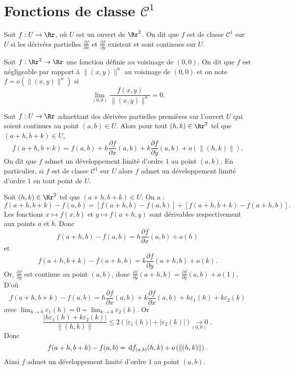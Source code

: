 \documentclass[class=report,crop=false]{standalone}
\begin{document}
\vskip8mm

\section{Fonctions de classe \texorpdfstring{$\mathscr{C}^1$}%
{C1}}

\vskip4mm

\begin{definition}Soit $f:U\to \Rr$, o\`u $U$ est un ouvert de $\Rr^2$. On dit que $f$ est de classe ${\mathscr C}^1$ sur $U$ si les dérivées partielles $\displaystyle \frac{\partial f}{\partial x}$ et $\displaystyle \frac{\partial f}{\partial y}$ existent et sont continues sur $U$.
\end{definition}

\vskip4mm

Soit $f:\Rr^2\to \Rr$ une fonction définie au voisinage de $(0,0)$. On dit que $f$ est négligeable par rapport à $\|(x,y)\|^n$ au voisinage de $(0,0)$ et on note $f=o\left(\|(x,y)\|^n\right)$ si 
$$\lim_{(0,0)}\frac{f(x,y)}{\|(x,y)\|^n}=0.$$

\vskip4mm

\begin{theoreme}Soit $f:U\to \Rr$ admettant des dérivées partielles premières sur l'ouvert $U$ qui soient continues au point $(a,b)\in U$. Alors pour tout $(h,k)\in \Rr^2$ tel que $(a+h,b+k)\in U$,
$$f(a+h,b+k)=f(a,b)+h\frac{\partial f}{\partial x}(a,b)+k\frac{\partial f}{\partial y}(a,b)+o\left(\|(h,k)\|\right).$$
On dit que $f$ admet un développement limité d'ordre $1$ au point $(a,b)$. En particulier, si $f$ est de classe ${\mathscr C}^1$ sur $U$ alors $f$ admet un développement limité d'ordre $1$ en tout point de $U$.
\end{theoreme}

\vskip4mm

Soit $(h,k)\in \Rr^2$ tel que $(a+h,b+k)\in U$. On a :
$$f(a+h,b+k)-f(a,b)=\left[f(a+h,b)-f(a,b)\right]+\left[f(a+h,b+k)-f(a+h,b)\right].$$
Les fonctions $x\mapsto f(x,b)$ et $y\mapsto f(a+h,y)$ sont dérivables respectivement aux points $a$ et $b$. Donc
$$f(a+h,b)-f(a,b)=h\frac{\partial f}{\partial x}(a,b)+o(h)$$
et
$$f(a+h,b+k)-f(a+h,b)=k\frac{\partial f}{\partial y}(a+h,b)+o(k).$$
Or, $\displaystyle \frac{\partial f}{\partial y}$ est continue au point $(a,b)$, donc $\displaystyle \frac{\partial f}{\partial y}(a+h,b)=\frac{\partial f}{\partial y}(a,b)+o(1)$. D'o\`u
$$f(a+h,b+k)-f(a,b)=h\frac{\partial f}{\partial x}(a,b)+k\frac{\partial f}{\partial x}(a,b)+h\varepsilon _1(h)+k\varepsilon _2(k)$$
avec $\displaystyle \lim _{h\to 0}\varepsilon _1(h)=0=\lim _{k\to 0}\varepsilon _2(k)$. Or
$$\frac{|h\varepsilon _1(h)+k\varepsilon _2(k)|}{\|(h,k)\|}\leq 2\left(|\varepsilon _1(h)|+|\varepsilon _2(k)|\right)\underset{(0,0)\; \; \; }{\longrightarrow 0}.$$
Donc
$$f(a+h,b+k)-f(a,b)=\,\mathrm{d} f_{(a,b)}(h,k)+o\left(\|(h,k)\|\right).$$
Ainsi $f$ admet un développement limité d'ordre $1$ au point $(a,b)$.
\end{document}
